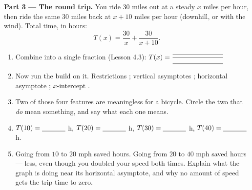 \documentclass[10pt]{article}
\begin{document}
\begin{tcolorbox}[colback=white, colframe=black!40, title=\textbf{Tier E --- Extension},
    fonttitle=\bfseries, arc=1.5mm, left=3mm, right=3mm, top=2mm, bottom=2mm, breakable]
\vspace{4pt}
\textbf{Part 3 --- The round trip.} You ride $30$ miles out at a steady $x$ miles per hour, then ride
the same $30$ miles back at $x+10$ miles per hour (downhill, or with the wind). Total time, in hours:
\[ T(x)=\frac{30}{x}+\frac{30}{x+10}. \]
\begin{enumerate}[label=(\alph*), leftmargin=2.1em, itemsep=5pt]
  \item Combine into a single fraction (Lesson 4.3): \; $T(x)=\dfrac{\rule{2.6cm}{0.4pt}}%
        {\rule{2.6cm}{0.4pt}}$
  \item Now run the build on it. Restrictions \blank{2.0cm}; vertical asymptotes \blank{2.4cm};
        horizontal asymptote \blank{1.4cm}; $x$-intercept \blank{1.6cm}.
  \item Two of those four features are meaningless for a bicycle. Circle the two that \emph{do} mean
        something, and say what each one means.
  \item $T(10)=\blank{1.2cm}$ h, \; $T(20)=\blank{1.2cm}$ h, \; $T(30)=\blank{1.2cm}$ h, \;
        $T(40)=\blank{1.2cm}$ h.
  \item Going from $10$ to $20$ mph saved \blank{1.4cm} hours. Going from $20$ to $40$ mph saved
        \blank{1.4cm} hours --- less, even though you doubled your speed both times. Explain what
        the graph is doing near its horizontal asymptote, and why no amount of speed gets the trip
        time to zero. 
\end{enumerate}
\end{tcolorbox}
\end{document}
